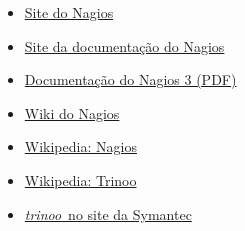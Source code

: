 \documentclass[10pt,a4paper]{article}
\newcommand{\trinoo}{\textit{trinoo}}
\begin{document}
\begin{itemize}
	\item \href{http://www.nagios.org/}{Site do Nagios}
	\item \href{http://www.nagios.org/documentation/}{Site da documentação do Nagios}
	\item \href{http://nagios.sourceforge.net/docs/nagios-3.pdf}{Documentação do Nagios 3 (PDF)}
	\item \href{http://wiki.nagios.org/index.php/Main\_Page}{Wiki do Nagios}
	\item \href{http://en.wikipedia.org/wiki/Nagios}{Wikipedia: Nagios}
	\item \href{http://en.wikipedia.org/wiki/Trinoo}{Wikipedia: Trinoo}
	\item \href{http://service1.symantec.com/sarc/sarc.nsf/html/W32.DoS.Trinoo.html}{\trinoo\ no site da Symantec}
\end{itemize}
\end{document}
